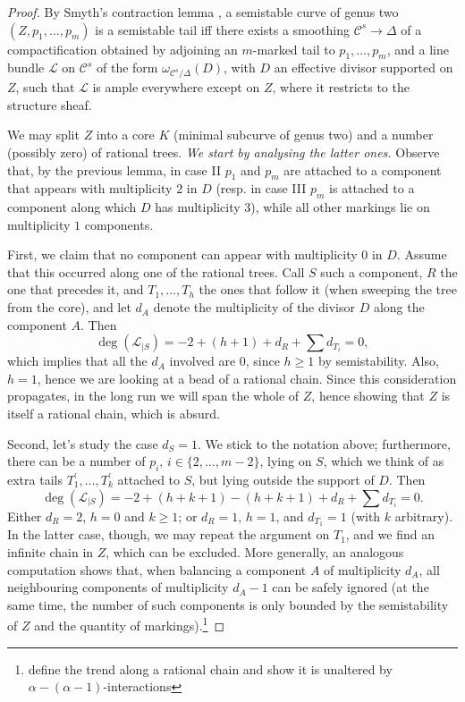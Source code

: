 \documentclass[11pt]{amsart}
\renewcommand{\to}{\rightarrow}
\newcommand{\dvr}{\Delta}
\theoremstyle{plain}
\theoremstyle{definition}
\begin{document}
\begin{proof}
 By Smyth's contraction lemma \cite[Lemma 2.13]{SMY1}, a semistable curve of genus two $(Z,p_1,\ldots,p_m)$ is a semistable tail iff there exists a smoothing $\mathcal C^s\to\dvr$ of a compactification obtained by adjoining an $m$-marked tail to $p_1,\ldots,p_m$, and a line bundle $\mathcal L$ on $\mathcal C^s$ of the form $\omega_{\mathcal C^s/\dvr}(D)$, with $D$ an effective divisor supported on $Z$, such that $\mathcal L$ is ample everywhere except on $Z$, where it restricts to the structure sheaf.
 
 We may split $Z$ into a core $K$ (minimal subcurve of genus two) and a number (possibly zero) of rational trees. \emph{We start by analysing the latter ones.} Observe that, by the previous lemma, in case II $p_1$ and $p_m$ are attached to a component that appears with multiplicity $2$ in $D$ (resp. in case III $p_m$ is attached to a component along which $D$ has multiplicity $3$), while all other markings lie on multiplicity $1$ components.
 
 First, we claim that no component can appear with multiplicity $0$ in $D$. Assume that this occurred along one of the rational trees. Call $S$ such a component, $R$ the one that precedes it, and $T_1,\ldots, T_h$ the ones that follow it (when sweeping the tree from the core), and let $d_A$ denote the multiplicity of the divisor $D$ along the component $A$. Then \[\deg(\mathcal L_{|S})= -2+(h+1)+d_R+\sum d_{T_i}=0,\]
 which implies that all the $d_A$ involved are $0$, since $h\geq1$ by semistability. Also, $h=1$, hence we are looking at a bead of a rational chain. Since this consideration propagates, in the long run we will span the whole of $Z$, hence showing that $Z$ is itself a rational chain, which is absurd.
 
 Second, let's study the case $d_S=1$. We stick to the notation above; furthermore, there can be a number of $p_i$, $i\in\{2,\ldots,m-2\}$, lying on $S$, which we think of as extra tails $T_1^\prime,\ldots,T_k^\prime$ attached to $S$, but lying outside the support of $D$. Then
 \[\deg(\mathcal L_{|S})= -2+(h+k+1)-(h+k+1)+d_R+\sum d_{T_i}=0.\]
 Either $d_R=2$, $h=0$ and $k\geq 1$; or $d_R=1$, $h=1$, and $d_{T_1}=1$ (with $k$ arbitrary). In the latter case, though, we may repeat the argument on $T_1$, and we find an infinite chain in $Z$, which can be excluded. More generally, an analogous computation shows that, when balancing a component $A$ of multiplicity $d_A$, all neighbouring components of multiplicity $d_A-1$ can be safely ignored (at the same time, the number of such components is only bounded by the semistability of $Z$ and the quantity of markings).\footnote{define the trend along a rational chain and show it is unaltered by $\alpha-(\alpha-1)$-interactions}
 

\end{proof}
\end{document}
